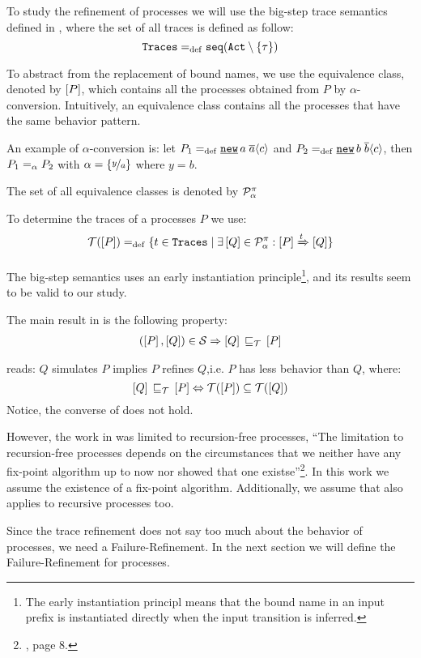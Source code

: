 To study the refinement of \picalc{} processes we will use the big-step trace semantics defined in \cite{gieseking}, where the set of all traces is defined as follow:
\[\tr \define \seqset{\actions\setminus\set{\tau}}\]

To abstract from the replacement of bound names, we use the equivalence class, denoted by $\left[P\right]$, which contains all the processes obtained from $P$ by $\alpha$-conversion. Intuitively, an equivalence class contains all the processes that have the same behavior pattern.

An example of $\alpha$-conversion is: let $P_1\define\procres{a}{\out{a}{c}}$ and $P_2\define\procres{b}{\out{b}{c}}$, then $P_1 =_\alpha{} P_2$ with $\alpha = \left\{\nicefrac{y}{a}\right\}$ where $y = b$.

The set of all equivalence classes is denoted by $\mathcal P^{\pi}_\alpha$ 

To determine the traces of a processes $P$ we use:
\begin{align}
    \traces[P] \define \{t\in \tr \mid \exists \ec{Q}\in\procsApha: \ec{P} \bigstep{t} \ec{Q}\}
\label{determine_trace}
\end{align}

The big-step semantics uses an early instantiation principle\footnote{The early instantiation principl means that the bound name in an input prefix is instantiated directly when the input transition is inferred.}, and its results seem to be valid to our study.

The main result in \cite{gieseking} is the following property:
\begin{align}
    (\ec{P},\ec{Q})\in{}\simu \Rightarrow \ec{Q} \refi \ec{P} \label{property1}
\end{align}

 reads: $Q$ simulates $P$ implies $P$ refines $Q$,i.e. $P$ has less behavior than $Q$, where:
\[\ec{Q}\refi \ec{P} \Leftrightarrow \traces[P]\subseteq\traces[Q]\]
Notice, the converse of  does not hold.

However, the work in \cite{gieseking} was limited to recursion-free processes, ``The limitation to recursion-free processes depends on the circumstances that we neither have any fix-point algorithm up to now nor showed that one existse''\footnote{\cite{gieseking}, page $8$.}. In this work we assume the existence of a fix-point algorithm. Additionally, we assume that  also applies to recursive processes too.

Since the trace refinement does not say too much about the behavior of processes, we need a Failure-Refinement. In the next section we will define the Failure-Refinement for \picalc{} processes.